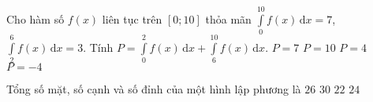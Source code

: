 \begin{ex}%
Cho hàm số $f(x)$ liên tục trên $[0;10]$ thỏa mãn $\displaystyle\int\limits_0^{10}f(x)\mathrm{\,d}x=7$, $\displaystyle\int\limits_2^6f(x)\mathrm{\,d}x=3$. Tính $P=\displaystyle\int\limits_0^2f(x)\mathrm{\,d}x+\displaystyle\int\limits_6^{10}f(x)\mathrm{\,d}x$.
\choice
{$P=7$}
{$P=10$}
{\True $P=4$}
{$P=-4$}
\end{ex}

\begin{ex}%
Tổng số mặt, số cạnh và số đỉnh của một hình lập phương là
\choice
{\True $26$}
{$30$}
{$22$}
{$24$}
\end{ex}

